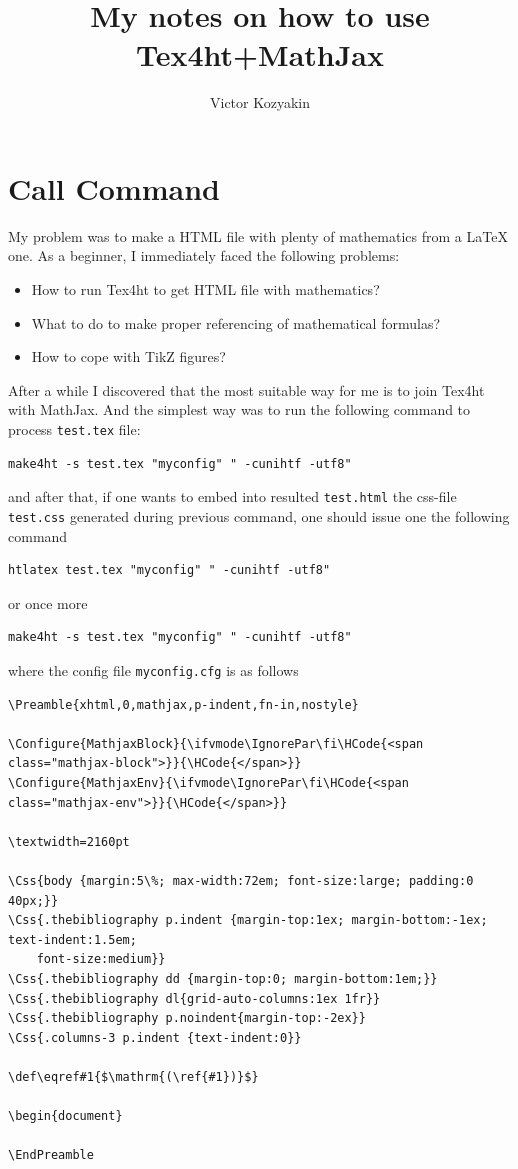 \documentclass{article}
\title{My notes on how to use Tex4ht+MathJax}
\author{Victor Kozyakin}
\begin{document}
\maketitle

\section{Call Command}\label{S1}
My problem was to make a HTML file with plenty of mathematics from a
\LaTeX{} one. As a beginner, I immediately faced the following
problems:
\begin{itemize}
  \item How to run Tex4ht to get HTML file with mathematics?
  \item What to do to make proper referencing of mathematical formulas?
  \item How to cope with TikZ figures?
\end{itemize}

After a while I discovered that the most suitable way for me is to join
Tex4ht with MathJax. And the simplest way was to run the following
command to process \verb|test.tex| file:

{\small
\begin{verbatim}
make4ht -s test.tex "myconfig" " -cunihtf -utf8"
\end{verbatim}}
\noindent and after that, if one wants to embed into resulted
\verb|test.html| the css-file \verb|test.css| generated during previous
command, one should issue one the following command {\small
    \begin{verbatim}
htlatex test.tex "myconfig" " -cunihtf -utf8"
\end{verbatim}
    \noindent or once more
    \begin{verbatim}
make4ht -s test.tex "myconfig" " -cunihtf -utf8"
\end{verbatim}}
\noindent where the config file \verb|myconfig.cfg| is as
follows

  {\small
    \begin{verbatim}
\Preamble{xhtml,0,mathjax,p-indent,fn-in,nostyle}

\Configure{MathjaxBlock}{\ifvmode\IgnorePar\fi\HCode{<span class="mathjax-block">}}{\HCode{</span>}}
\Configure{MathjaxEnv}{\ifvmode\IgnorePar\fi\HCode{<span class="mathjax-env">}}{\HCode{</span>}}

\textwidth=2160pt

\Css{body {margin:5\%; max-width:72em; font-size:large; padding:0 40px;}}
\Css{.thebibliography p.indent {margin-top:1ex; margin-bottom:-1ex; text-indent:1.5em;
    font-size:medium}}
\Css{.thebibliography dd {margin-top:0; margin-bottom:1em;}}
\Css{.thebibliography dl{grid-auto-columns:1ex 1fr}}
\Css{.thebibliography p.noindent{margin-top:-2ex}}
\Css{.columns-3 p.indent {text-indent:0}}

\def\eqref#1{$\mathrm{(\ref{#1})}$}

\begin{document}

\EndPreamble
\end{verbatim}}
\end{document}
